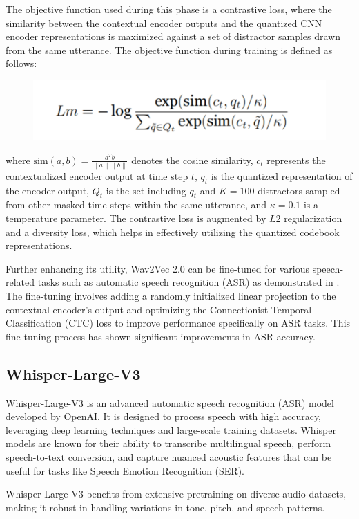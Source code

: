 \documentclass[a4paper,12pt]{article}
\begin{document}
The objective function used during this phase is a contrastive loss, where the similarity between the contextual encoder outputs and the quantized CNN encoder representations is maximized against a set of distractor samples drawn from the same utterance. The objective function during training is defined as follows:

\begin{figure}[H]
    \centering
    \includegraphics[width=0.5\linewidth]{Lostfunction.png}
\end{figure}

where \(\text{sim}(a, b) = \frac{a^T b}{\|a\| \|b\|}\) denotes the cosine similarity, \(c_t\) represents the contextualized encoder output at time step \(t\), \(q_t\) is the quantized representation of the encoder output, \(Q_t\) is the set including \(q_t\) and \(K = 100\) distractors sampled from other masked time steps within the same utterance, and \(\kappa = 0.1\) is a temperature parameter. The contrastive loss is augmented by \(L2\) regularization and a diversity loss, which helps in effectively utilizing the quantized codebook representations.

Further enhancing its utility, Wav2Vec 2.0 can be fine-tuned for various speech-related tasks such as automatic speech recognition (ASR) as demonstrated in \cite{ref23}. The fine-tuning involves adding a randomly initialized linear projection to the contextual encoder’s output and optimizing the Connectionist Temporal Classification (CTC) loss to improve performance specifically on ASR tasks. This fine-tuning process has shown significant improvements in ASR accuracy.

\subsection{Whisper-Large-V3}
Whisper-Large-V3 is an advanced automatic speech recognition (ASR) model developed by OpenAI. It is designed to process speech with high accuracy, leveraging deep learning techniques and large-scale training datasets. Whisper models are known for their ability to transcribe multilingual speech, perform speech-to-text conversion, and capture nuanced acoustic features that can be useful for tasks like Speech Emotion Recognition (SER). 

Whisper-Large-V3 benefits from extensive pretraining on diverse audio datasets, making it robust in handling variations in tone, pitch, and speech patterns.
\end{document}
